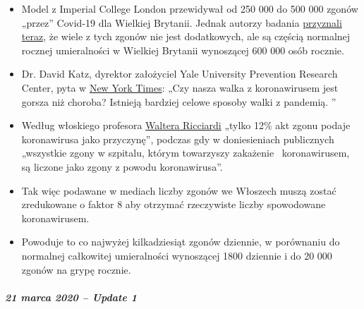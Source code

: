 \begin{itemize}
\tightlist
\item
  Model z Imperial College London przewidywał od 250 000 do 500 000
  zgonów „przez'' Covid-19 dla Wielkiej Brytanii. Jednak autorzy badania
  \href{https://www.bbc.com/news/health-51979654}{przyznali teraz}, że
  wiele z tych zgonów nie jest dodatkowych, ale są częścią normalnej
  rocznej umieralności w Wielkiej Brytanii wynoszącej 600 000 osób
  rocznie.
\item
  Dr. David Katz, dyrektor założyciel Yale University Prevention
  Research Center, pyta w
  \href{https://www.nytimes.com/2020/03/20/opinion/coronavirus-pandemic-social-distancing.html}{New
  York Times}: „Czy nasza walka z koronawirusem jest gorsza niż choroba?
  Istnieją bardziej celowe sposoby walki z pandemią. ''
\item
  Według włoskiego profesora
  \href{https://web.archive.org/web/20200324214448/https://www.telegraph.co.uk/global-health/science-and-disease/have-many-coronavirus-patients-died-italy/}{Waltera
  Ricciardi} „tylko 12\% akt zgonu podaje koronawirusa jako przyczynę'',
  podczas gdy w doniesieniach publicznych „wszystkie zgony w szpitalu,
  którym towarzyszy zakażenie~ koronawirusem, są liczone jako zgony z
  powodu koronawirusa''.
\item
  Tak więc podawane w mediach liczby zgonów we Włoszech muszą zostać
  zredukowane o faktor 8 aby otrzymać rzeczywiste liczby spowodowane
  koronawirusem.
\item
  Powoduje to co najwyżej kilkadziesiąt zgonów dziennie, w porównaniu do
  normalnej całkowitej umieralności wynoszącej 1800 dziennie i do 20 000
  zgonów na grypę rocznie.
\end{itemize}

\hypertarget{21-marca-2020--update-1}{%
\subparagraph{\texorpdfstring{\textbf{21 marca 2020 -- Update
1}}{21 marca 2020 -- Update 1}}\label{21-marca-2020--update-1}}


